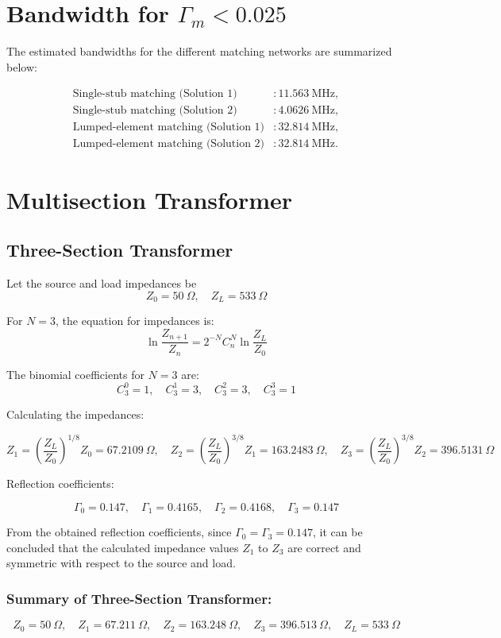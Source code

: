 \documentclass[a4paper,11pt]{article}
\begin{document}
\section{Bandwidth for $\Gamma_m < 0.025$}

The estimated bandwidths for the different matching networks are summarized below:

\[
\begin{aligned}
\text{Single-stub matching (Solution 1)} &: 11.563~\text{MHz},\\
\text{Single-stub matching (Solution 2)} &: 4.0626~\text{MHz},\\
\text{Lumped-element matching (Solution 1)} &: 32.814~\text{MHz},\\
\text{Lumped-element matching (Solution 2)} &: 32.814~\text{MHz}.
\end{aligned}
\]

\section{Multisection Transformer}

\subsection*{Three-Section Transformer}

Let the source and load impedances be
\[
Z_0 = 50~\Omega, \quad Z_L = 533~\Omega
\]

For $N = 3$, the equation for impedances is:
\[
\ln\frac{Z_{n+1}}{Z_n} = 2^{-N} C_n^N \ln \frac{Z_L}{Z_0}
\]

The binomial coefficients for $N = 3$ are:
\[
C_3^0 = 1, \quad C_3^1 = 3, \quad C_3^2 = 3, \quad C_3^3 = 1
\]

Calculating the impedances:

\[
Z_1 = \left(\frac{Z_L}{Z_0}\right)^{1/8} Z_0 = 67.2109~\Omega, \quad
Z_2 = \left(\frac{Z_L}{Z_0}\right)^{3/8} Z_1 = 163.2483~\Omega, \quad
Z_3 = \left(\frac{Z_L}{Z_0}\right)^{3/8} Z_2 = 396.5131~\Omega
\]

Reflection coefficients:

\[
\Gamma_0 = 0.147, \quad
\Gamma_1 = 0.4165, \quad
\Gamma_2 = 0.4168, \quad
\Gamma_3 = 0.147
\]

From the obtained reflection coefficients, since $\Gamma_0 = \Gamma_3 = 0.147$, it can be concluded that the calculated impedance values $Z_1$ to $Z_3$ are correct and symmetric with respect to the source and load.

\subsubsection*{Summary of Three-Section Transformer:}
\[
Z_0 = 50~\Omega, \quad Z_1 = 67.211~\Omega, \quad Z_2 = 163.248~\Omega, \quad Z_3 = 396.513~\Omega, \quad Z_L = 533~\Omega
\]
\end{document}
